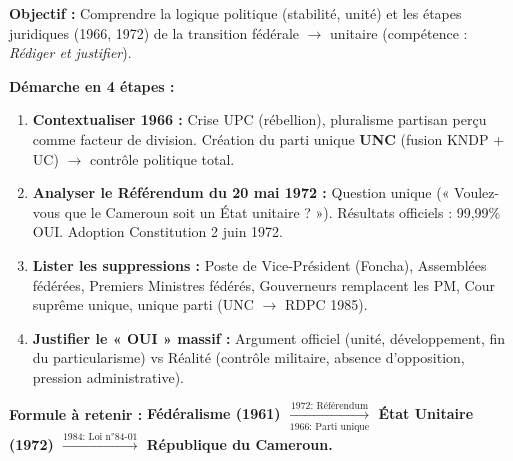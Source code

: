 \documentclass[11pt]{article}
\begin{document}
\begin{methode}
\textbf{Objectif :} Comprendre la logique politique (stabilité, unité) et les étapes juridiques (1966, 1972) de la transition fédérale $\rightarrow$ unitaire (compétence : \emph{Rédiger et justifier}).
\par
\textbf{Démarche en 4 étapes :}
\begin{enumerate}
    \item \textbf{Contextualiser 1966 :} Crise UPC (rébellion), pluralisme partisan perçu comme facteur de division. Création du parti unique \textbf{UNC} (fusion KNDP + UC) $\rightarrow$ contrôle politique total.
    \item \textbf{Analyser le Référendum du 20 mai 1972 :} Question unique (« Voulez-vous que le Cameroun soit un État unitaire ? »). Résultats officiels : 99,99\% OUI. Adoption Constitution 2 juin 1972.
    \item \textbf{Lister les suppressions :} Poste de Vice-Président (Foncha), Assemblées fédérées, Premiers Ministres fédérés, Gouverneurs remplacent les PM, Cour suprême unique, unique parti (UNC $\rightarrow$ RDPC 1985).
    \item \textbf{Justifier le « OUI » massif :} Argument officiel (unité, développement, fin du particularisme) vs Réalité (contrôle militaire, absence d'opposition, pression administrative).
\end{enumerate}
\textbf{Formule à retenir :} \textbf{Fédéralisme (1961) $\xrightarrow[\text{1966: Parti unique}]{\text{1972: Référendum}}$ État Unitaire (1972) $\xrightarrow{\text{1984: Loi n°84-01}}$ République du Cameroun.}
\end{methode}
\end{document}
